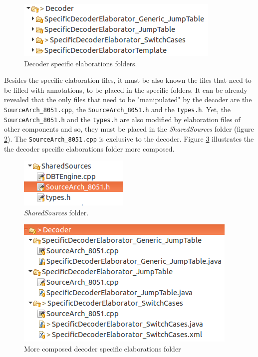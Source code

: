 \begin{figure}[H]
\centerline{
\includegraphics[scale=0.5]{images/spec1}
}
\caption{Decoder specific elaborations folders.}
\label{fig:decoder_spec2}
\end{figure}

Besides the specific elaboration files, it must be also known the files that need to be filled with annotations, to be placed in the specific folders. It can be already revealed that the only files that need to be "manipulated" by the decoder are the \texttt{SourceArch\_8051.cpp}, the \texttt{SourceArch\_8051.h} and the \texttt{types.h}. Yet, the \texttt{SourceArch\_8051.h} and the  \texttt{types.h} are also modified by elaboration files of other components and so, they must be placed in the \textit{SharedSources} folder (figure \ref{fig:decoder_spec3}). The \texttt{SourceArch\_8051.cpp} is exclusive to the decoder. Figure \ref{fig:decoder_spec4} illustrates the the decoder specific elaborations folder more composed.

\begin{figure}[H]
\centerline{
\includegraphics[scale=0.6]{images/spec2}
}
\caption{\textit{SharedSources} folder.}
\label{fig:decoder_spec3}
\end{figure}


\begin{figure}[H]
\centerline{
\includegraphics[scale=0.5]{images/spec3}
}
\caption{More composed decoder specific elaborations folder}
\label{fig:decoder_spec4}
\end{figure}

